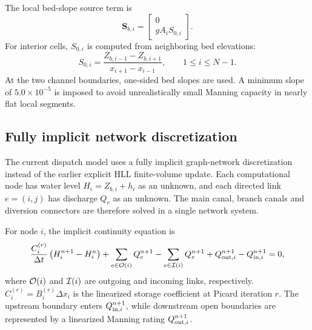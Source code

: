 The local bed-slope source term is
\begin{equation}
    \mathbf{S}_{b,i} =
    \left[
    \begin{array}{c}
        0 \\
        g A_i S_{0,i}
    \end{array}
    \right].
\end{equation}
For interior cells, \(S_{0,i}\) is computed from neighboring bed elevations:
\begin{equation}
    S_{0,i} =
    \frac{Z_{b,i-1} - Z_{b,i+1}}{x_{i+1}-x_{i-1}},
    \qquad 1 \le i \le N-1.
\end{equation}
At the two channel boundaries, one-sided bed slopes are used. A minimum slope of
\(5.0\times 10^{-5}\) is imposed to avoid unrealistically small Manning
capacity in nearly flat local segments.

\subsection{Fully implicit network discretization}

The current dispatch model uses a fully implicit graph-network discretization
instead of the earlier explicit HLL finite-volume update. Each computational
node has water level \(H_i=Z_{b,i}+h_i\) as an unknown, and each directed link
\(e=(i,j)\) has discharge \(Q_e\) as an unknown. The main canal, branch canals
and diversion connectors are therefore solved in a single network system.

For node \(i\), the implicit continuity equation is
\begin{equation}
    \frac{C_i^{(r)}}{\Delta t}
    \left(
        H_i^{n+1}-H_i^n
    \right)
    +
    \sum_{e\in{\cal O}(i)} Q_e^{n+1}
    -
    \sum_{e\in{\cal I}(i)} Q_e^{n+1}
    +
    Q_{{\rm out},i}^{n+1}
    -
    Q_{{\rm in},i}^{n+1}
    =0,
\end{equation}
where \({\cal O}(i)\) and \({\cal I}(i)\) are outgoing and incoming links,
respectively. \(C_i^{(r)}=B_i^{(r)}\Delta x_i\) is the linearized storage
coefficient at Picard iteration \(r\). The upstream boundary enters
\(Q_{{\rm in},i}^{n+1}\), while downstream open boundaries are represented by a
linearized Manning rating \(Q_{{\rm out},i}^{n+1}\).

